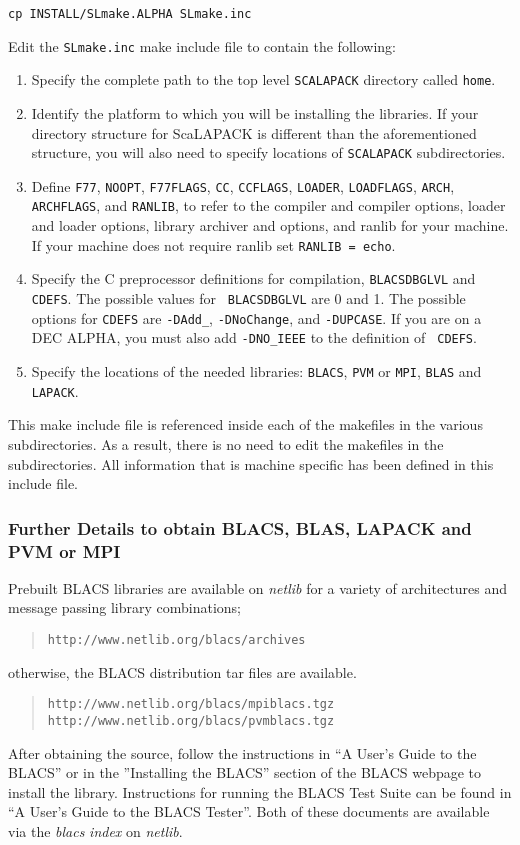 \documentclass[11pt]{report}
\begin{document}
\begin{list}{}{}
\item {\tt cp INSTALL/SLmake.ALPHA SLmake.inc}
\end{list}

Edit the {\tt SLmake.inc} make include file to contain the following:
\begin{enumerate}
\item
Specify the complete path to the top level
{\tt SCALAPACK} directory called {\tt home}.
\item  Identify the platform to which you will
be installing the libraries.  If your directory structure for ScaLAPACK
is different than the aforementioned structure, you will also need to
specify locations of {\tt SCALAPACK} subdirectories.
\item
Define {\tt F77}, {\tt NOOPT},
{\tt F77FLAGS}, {\tt CC}, {\tt CCFLAGS}, {\tt LOADER}, {\tt LOADFLAGS},
{\tt ARCH}, {\tt ARCHFLAGS}, and {\tt RANLIB}, to refer to the compiler
and compiler options, loader and loader options, library archiver
and options, and ranlib for your machine.
If your machine does not require ranlib set {\tt RANLIB = echo}.
\item Specify the C preprocessor definitions for compilation,
{\tt BLACSDBGLVL} and {\tt CDEFS}.  The possible values for {\tt
BLACSDBGLVL} are 0 and 1.  The possible options for {\tt CDEFS} are
{\tt -DAdd\_}, {\tt -DNoChange}, and {\tt -DUPCASE}.  If you are on a
DEC ALPHA, you must also add {\tt -DNO\_IEEE} to the definition of {\tt
CDEFS}.
\item Specify the locations
of the needed libraries: {\tt BLACS}, {\tt PVM} or {\tt MPI}, {\tt BLAS}
and {\tt LAPACK}.
\end{enumerate}
This make include file is referenced inside each of the makefiles in the
various subdirectories.  As a result, there is no need to edit the
makefiles in the subdirectories.  All information that is machine
specific has been defined in this include file.

\subsubsection{Further Details to obtain BLACS, BLAS, LAPACK and PVM or MPI}

Prebuilt BLACS libraries are available on
{\em netlib} for a variety of architectures and message passing library
combinations;
\begin{quote}
{\tt http://www.netlib.org/blacs/archives}
\end{quote}
otherwise, the BLACS distribution tar files are available.
\begin{quote}
{\tt http://www.netlib.org/blacs/mpiblacs.tgz} \\
{\tt http://www.netlib.org/blacs/pvmblacs.tgz}
\end{quote}
After obtaining the source, follow the 
instructions in ``A User's Guide to the BLACS'' or in the ''Installing
the BLACS'' section of the BLACS webpage to install the library.  Instructions
for running the BLACS Test Suite can be found in ``A User's Guide to the
BLACS Tester''.  Both of these documents are available via the
{\em blacs} {\em index} on {\em netlib}.
\end{document}
